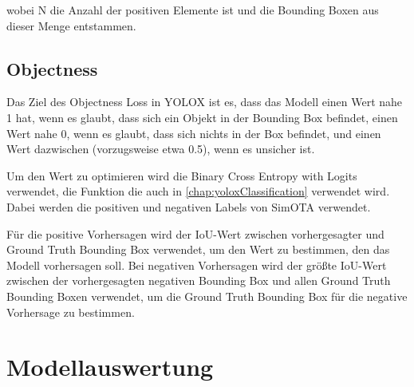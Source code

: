 wobei N die Anzahl der positiven Elemente ist und die Bounding Boxen aus dieser Menge entstammen. \cite{yoloxExplanationHowWorks}

\subsection{Objectness}
Das Ziel des Objectness Loss in YOLOX ist es, dass das Modell einen Wert nahe 1 hat, wenn es glaubt, dass sich ein Objekt in der Bounding Box befindet, einen Wert nahe 0, wenn es glaubt, dass sich nichts in der Box befindet, und einen Wert dazwischen (vorzugsweise etwa 0.5), wenn es unsicher ist.

Um den Wert zu optimieren wird die Binary Cross Entropy with Logits verwendet, die Funktion die auch in \ref{chap:yoloxClassification} verwendet wird. Dabei werden die positiven und negativen Labels von SimOTA verwendet.

Für die positive Vorhersagen wird der IoU-Wert zwischen vorhergesagter und Ground Truth Bounding Box verwendet, um den Wert zu bestimmen, den das Modell vorhersagen soll. Bei negativen Vorhersagen wird der größte IoU-Wert zwischen der vorhergesagten negativen Bounding Box und allen Ground Truth Bounding Boxen verwendet, um die Ground Truth Bounding Box für die negative Vorhersage zu bestimmen. \cite{yoloxExplanationHowWorks}

\section{Modellauswertung}



